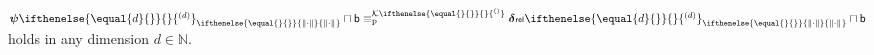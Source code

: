 \documentclass{CSML}
\let\originalleft\left
\let\originalright\right
\renewcommand{\left}{\mathopen{}\mathclose\bgroup\originalleft}
\renewcommand{\right}{\aftergroup\egroup\originalright}
\newcommand{\representation}[2]{ #1\ifnotempty{#2}{^{(#2)}} }
\newcommand{\IN}{\mathbb{N}}
\newcommand{\reldistrep}[1][\empty]{ \representation{%
	\bm{\delta}\kern.05ex{\scriptstyle\mathsf{rel}}\kern.1ex%
	}{#1} }
\newcommand{\setrep}[1][\empty]{ \representation{\bm{\psi}}{#1} }
\newcommand{\sisetrep}[1][\empty]{ \representation{ \widehat{\bm{\psi}} }{#1} }
\newcommand{\norm}[2][\empty]{
   \ifthenelse{\equal{#1}{\empty}}{%
      \left\|#2\right\|
   }{%
      \left\|#2\right\|_{#1}
   }
}
\newcommand{\normdot}[1][\empty]{\norm[#1]{\cdot}}
\newcommand{\ndot}[1][\empty]{\normdot[#1]}
\newcommand{\wrtn}[2]{#1_{#2}}
\newcommand{\compset}[1][\empty]{ \representation{\mathcal{K}}{#1} }
\newcommand{\ifnotempty}[2]{ \ifthenelse{ \equal{#1}{\empty} }{}{#2} }
\newcommand{\pequiv}{\equiv_\mathrm{p}}
\newcommand{\enp}[1]{\sqcap \mathsf{#1}}
\begin{document}
\begin{prop}                                \label{prop:setrep-reldrep}
$\wrtn{\setrep[d]}{\ndot} \enp{b} \pequiv^{\compset}
	\wrtn{\reldistrep[d]}{\ndot} \enp{b}$
holds in any dimension $d \in \IN$.
\end{prop}
%
\end{document}
